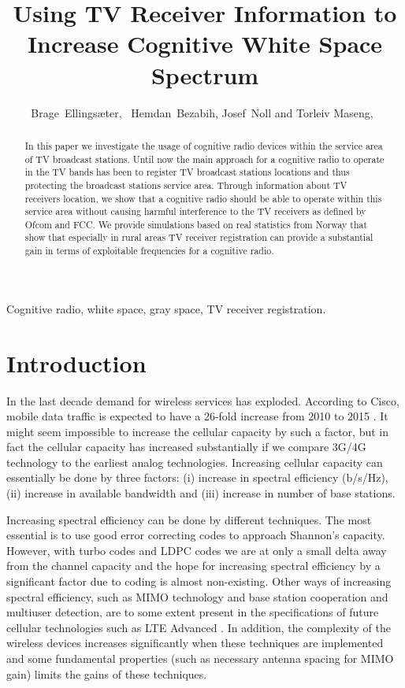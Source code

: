 \documentclass[journal,11pt,draftclsnofoot,onecolumn]{IEEEtran}
\title{Using TV Receiver Information to Increase Cognitive White Space Spectrum}
\author{Brage~Ellings\ae ter,~\IEEEmembership{Student Member,~IEEE,}
				Hemdan~Bezabih, Josef~Noll and
				Torleiv Maseng,~\IEEEmembership{Member,~IEEE}}
\begin{document}
\maketitle

\begin{abstract}
In this paper we investigate the usage of cognitive radio devices within the service area of TV broadcast stations. Until now the main approach for a cognitive radio to operate in the TV bands has been to register TV broadcast stations locations and thus protecting the broadcast stations service area. Through information about TV receivers location, we show that a cognitive radio should be able to operate within this service area without causing harmful interference to the TV receivers as defined by Ofcom and FCC. We provide simulations based on real statistics from Norway that show that especially in rural areas TV receiver registration can provide a substantial gain in terms of exploitable frequencies for a cognitive radio.
\end{abstract}

\begin{IEEEkeywords}
Cognitive radio, white space, gray space, TV receiver registration.
\end{IEEEkeywords}

\section{Introduction}
In the last decade demand for wireless services has exploded. According to Cisco, mobile data traffic is expected to have a 26-fold increase from 2010 to 2015 \cite{cisco}. It might seem impossible to increase the cellular capacity by such a factor, but in fact the cellular capacity has increased substantially if we compare 3G/4G technology to the earliest analog technologies. Increasing cellular capacity can essentially be done by three factors: (i) increase in spectral efficiency (b/s/Hz), (ii) increase in available bandwidth and (iii) increase in number of base stations.

Increasing spectral efficiency can be done by different techniques. The most essential is to use good error correcting codes to approach Shannon's capacity. However, with turbo codes and LDPC codes we are at only a small delta away from the channel capacity and the hope for increasing spectral efficiency by a significant factor due to coding is almost non-existing. Other ways of increasing spectral efficiency, such as MIMO technology and base station cooperation and multiuser detection, are to some extent present in the specifications of future cellular technologies such as LTE Advanced \cite{4907410}\cite{3gpp1}. In addition, the complexity of the wireless devices increases significantly when these techniques are implemented and some fundamental properties (such as necessary antenna spacing for MIMO gain) limits the gains of these techniques.
\end{document}

